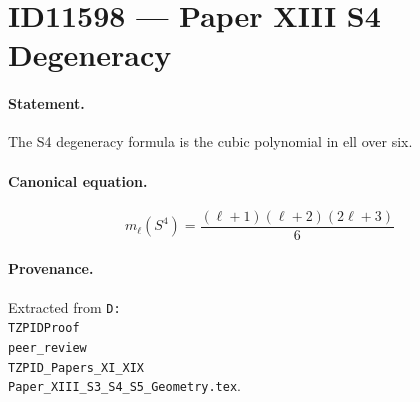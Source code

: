 \section*{ID11598 --- Paper XIII S4 Degeneracy}

\paragraph{Statement.}
The S4 degeneracy formula is the cubic polynomial in ell over six.

\paragraph{Canonical equation.}
\[
m_\ell(S^4)=\frac{(\ell+1)(\ell+2)(2\ell+3)}{6}
\]

\paragraph{Provenance.}
Extracted from \texttt{D:\\TZPIDProof\\peer\_review\\TZPID\_Papers\_XI\_XIX\\Paper\_XIII\_S3\_S4\_S5\_Geometry.tex}.
